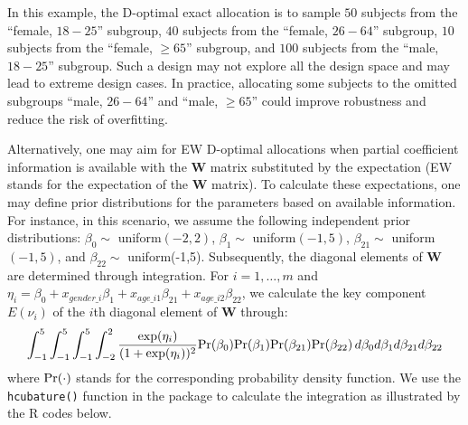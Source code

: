 In this example, the D-optimal exact allocation is to sample $50$ subjects from the ``female, $18-25$'' subgroup, $40$ subjects from the ``female, $26-64$'' subgroup, $10$ subjects from the ``female, $\ge 65$'' subgroup, and $100$ subjects from the ``male, $18-25$'' subgroup. Such a design may not explore all the design space and may lead to extreme design cases. In practice, allocating some subjects to the omitted subgroups ``male, $26-64$'' and ``male, $\ge 65$'' could improve robustness and reduce the risk of overfitting.


Alternatively, one may aim for EW D-optimal allocations when partial coefficient information is available with the ${\mathbf W}$ matrix substituted by the expectation (EW stands for the expectation of the ${\mathbf W}$ matrix). To calculate these expectations, one may define prior distributions for the parameters based on available information. For instance, in this scenario, we assume the following independent prior distributions: $\beta_0\sim$ uniform$(-2,2)$, $\beta_1\sim$ uniform$(-1,5)$, $\beta_{21}\sim$ uniform$(-1,5)$, and $\beta_{22}\sim$ uniform(-1,5). Subsequently, the diagonal elements of ${\mathbf W}$ are determined through integration. For $i=1,\dots,m$ and $\eta_i = \beta_0 + x_{gender\_i}\beta_1+ x_{age\_i1}\beta_{21}+ x_{age\_i2}\beta_{22}$, we calculate the key component $E(\nu_i)$ of the $i$th diagonal element of ${\mathbf W}$ through:
\begin{equation*}
  \int_{-1}^{5} \int_{-1}^{5} \int_{-1}^{5} \int_{-2}^{2} \frac{\exp(\eta_i)}{(1+\exp(\eta_i))^2} {\rm Pr}(\beta_0){\rm Pr}(\beta_{1}){\rm Pr}(\beta_{21}){\rm Pr}(\beta_{22}) \, d\beta_0 d\beta_1 d\beta_{21} d\beta_{22}
\end{equation*}
where $\rm{Pr}(\cdot)$ stands for the corresponding probability density function.
We use the \texttt{hcubature()} function in the  package to calculate the integration as illustrated by the R codes below.

